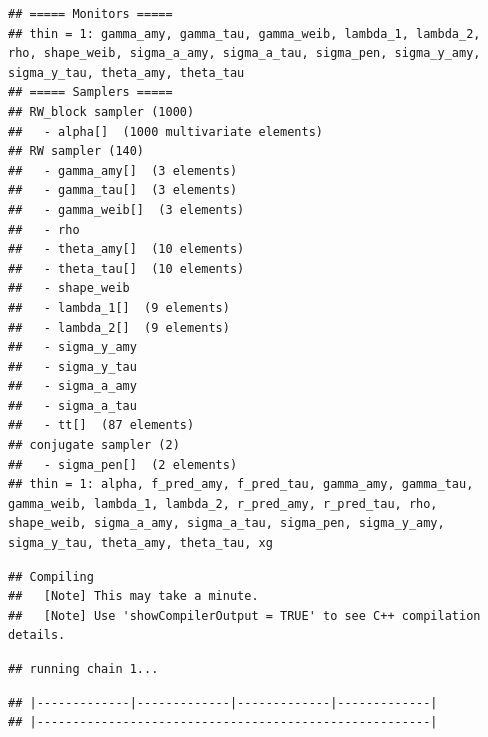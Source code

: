 \documentclass[
]{article}
\begin{document}
\begin{verbatim}
## ===== Monitors =====
## thin = 1: gamma_amy, gamma_tau, gamma_weib, lambda_1, lambda_2, rho, shape_weib, sigma_a_amy, sigma_a_tau, sigma_pen, sigma_y_amy, sigma_y_tau, theta_amy, theta_tau
## ===== Samplers =====
## RW_block sampler (1000)
##   - alpha[]  (1000 multivariate elements)
## RW sampler (140)
##   - gamma_amy[]  (3 elements)
##   - gamma_tau[]  (3 elements)
##   - gamma_weib[]  (3 elements)
##   - rho
##   - theta_amy[]  (10 elements)
##   - theta_tau[]  (10 elements)
##   - shape_weib
##   - lambda_1[]  (9 elements)
##   - lambda_2[]  (9 elements)
##   - sigma_y_amy
##   - sigma_y_tau
##   - sigma_a_amy
##   - sigma_a_tau
##   - tt[]  (87 elements)
## conjugate sampler (2)
##   - sigma_pen[]  (2 elements)
## thin = 1: alpha, f_pred_amy, f_pred_tau, gamma_amy, gamma_tau, gamma_weib, lambda_1, lambda_2, r_pred_amy, r_pred_tau, rho, shape_weib, sigma_a_amy, sigma_a_tau, sigma_pen, sigma_y_amy, sigma_y_tau, theta_amy, theta_tau, xg
\end{verbatim}

\begin{verbatim}
## Compiling
##   [Note] This may take a minute.
##   [Note] Use 'showCompilerOutput = TRUE' to see C++ compilation details.
\end{verbatim}

\begin{verbatim}
## running chain 1...
\end{verbatim}

\begin{verbatim}
## |-------------|-------------|-------------|-------------|
## |-------------------------------------------------------|
\end{verbatim}
\end{document}

